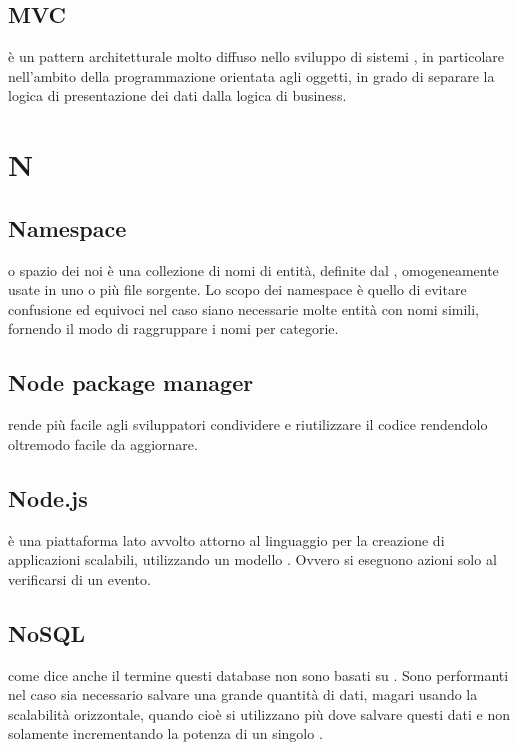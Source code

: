 \documentclass[12pt,a4paper]{article}
\begin{document}
\subsection{MVC} 
 è un pattern architetturale molto diffuso nello sviluppo di sistemi , in particolare nell'ambito della programmazione orientata agli oggetti, in grado di separare la logica di presentazione dei dati dalla logica di business.


\newpage

\section{N}



\subsection{Namespace} 
 o spazio dei noi è una collezione di nomi di entità, definite dal , omogeneamente usate in uno o più file sorgente. Lo scopo dei namespace è quello di evitare confusione ed equivoci nel caso siano necessarie molte entità con nomi simili, fornendo il modo di raggruppare i nomi per categorie.

\subsection{Node package manager} 
 rende più facile agli sviluppatori  condividere e riutilizzare il codice rendendolo oltremodo facile da aggiornare.

\subsection{Node.js} 
 è una piattaforma lato  avvolto attorno al linguaggio  per la creazione di applicazioni scalabili, utilizzando un modello . Ovvero si eseguono azioni solo al verificarsi di un evento.

\subsection{NoSQL} 
 come dice anche il termine questi database non sono basati su . Sono performanti nel caso sia necessario salvare una grande quantità di dati, magari usando la scalabilità orizzontale, quando cioè si utilizzano più  dove salvare questi dati e non solamente incrementando la potenza di un singolo .
\end{document}
